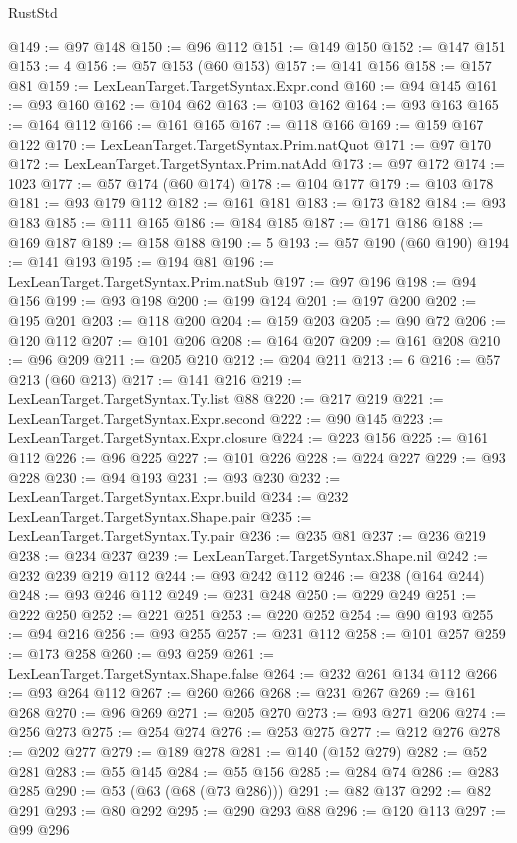 \begin{lexlean}{RustStd}
\begin{coremodule}
@149 := @97 @148
@150 := @96 @112
@151 := @149 @150
@152 := @147 @151
@153 := 4
@156 := @57 @153 (@60 @153)
@157 := @141 @156
@158 := @157 @81
@159 := LexLeanTarget.TargetSyntax.Expr.cond
@160 := @94 @145
@161 := @93 @160
@162 := @104 @62
@163 := @103 @162
@164 := @93 @163
@165 := @164 @112
@166 := @161 @165
@167 := @118 @166
@169 := @159 @167 @122
@170 := LexLeanTarget.TargetSyntax.Prim.natQuot
@171 := @97 @170
@172 := LexLeanTarget.TargetSyntax.Prim.natAdd
@173 := @97 @172
@174 := 1023
@177 := @57 @174 (@60 @174)
@178 := @104 @177
@179 := @103 @178
@181 := @93 @179 @112
@182 := @161 @181
@183 := @173 @182
@184 := @93 @183
@185 := @111 @165
@186 := @184 @185
@187 := @171 @186
@188 := @169 @187
@189 := @158 @188
@190 := 5
@193 := @57 @190 (@60 @190)
@194 := @141 @193
@195 := @194 @81
@196 := LexLeanTarget.TargetSyntax.Prim.natSub
@197 := @97 @196
@198 := @94 @156
@199 := @93 @198
@200 := @199 @124
@201 := @197 @200
@202 := @195 @201
@203 := @118 @200
@204 := @159 @203
@205 := @90 @72
@206 := @120 @112
@207 := @101 @206
@208 := @164 @207
@209 := @161 @208
@210 := @96 @209
@211 := @205 @210
@212 := @204 @211
@213 := 6
@216 := @57 @213 (@60 @213)
@217 := @141 @216
@219 := LexLeanTarget.TargetSyntax.Ty.list @88
@220 := @217 @219
@221 := LexLeanTarget.TargetSyntax.Expr.second
@222 := @90 @145
@223 := LexLeanTarget.TargetSyntax.Expr.closure
@224 := @223 @156
@225 := @161 @112
@226 := @96 @225
@227 := @101 @226
@228 := @224 @227
@229 := @93 @228
@230 := @94 @193
@231 := @93 @230
@232 := LexLeanTarget.TargetSyntax.Expr.build
@234 := @232 LexLeanTarget.TargetSyntax.Shape.pair
@235 := LexLeanTarget.TargetSyntax.Ty.pair
@236 := @235 @81
@237 := @236 @219
@238 := @234 @237
@239 := LexLeanTarget.TargetSyntax.Shape.nil
@242 := @232 @239 @219 @112
@244 := @93 @242 @112
@246 := @238 (@164 @244)
@248 := @93 @246 @112
@249 := @231 @248
@250 := @229 @249
@251 := @222 @250
@252 := @221 @251
@253 := @220 @252
@254 := @90 @193
@255 := @94 @216
@256 := @93 @255
@257 := @231 @112
@258 := @101 @257
@259 := @173 @258
@260 := @93 @259
@261 := LexLeanTarget.TargetSyntax.Shape.false
@264 := @232 @261 @134 @112
@266 := @93 @264 @112
@267 := @260 @266
@268 := @231 @267
@269 := @161 @268
@270 := @96 @269
@271 := @205 @270
@273 := @93 @271 @206
@274 := @256 @273
@275 := @254 @274
@276 := @253 @275
@277 := @212 @276
@278 := @202 @277
@279 := @189 @278
@281 := @140 (@152 @279)
@282 := @52 @281
@283 := @55 @145
@284 := @55 @156
@285 := @284 @74
@286 := @283 @285
@290 := @53 (@63 (@68 (@73 @286)))
@291 := @82 @137
@292 := @82 @291
@293 := @80 @292
@295 := @290 @293 @88
@296 := @120 @113
@297 := @99 @296

\end{coremodule}
\end{lexlean}
